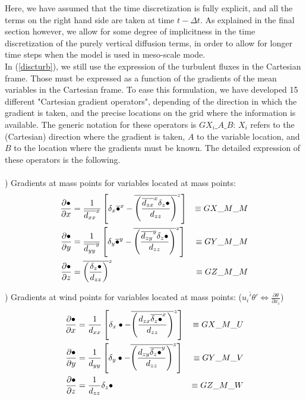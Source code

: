Here, we have assumed that the time discretization is fully explicit, and all
the terms on the right hand side are taken at time $t-\Delta t$. As
explained in the final section however, we allow for some degree of implicitness
in the time discretization of the purely vertical diffusion terms, in order
to allow for longer time steps when the model is used in meso-scale mode.
\\

In (\ref{discturb}), we still use the expression of the
turbulent fluxes in the Cartesian frame. Those must be expressed as a function
of the gradients of the mean variables in the Cartesian frame. To ease this
formulation, we have developed 15 different "Cartesian gradient operators",
depending of the direction in which the gradient is taken, and the precise
locations on the grid where the  information is available. The generic notation
for these operators is $GX_i\_A\_B$: $X_i$ refers to the (Cartesian) direction
where the gradient is taken, $A$ to the variable location, and $B$ to the
location where the gradients must be known. The detailed expression of these
operators is the following.
\\
\\
) Gradients at mass points for variables located at mass points:
\begin{eqnarray}
\frac{\partial \bullet}{\partial x}&=
\frac{1}{\overline{d_{xx}}^x}\left[ \delta_x \overline{\bullet}^x -
\overline{\left({\overline{d_{zx}}^x \delta_z \bullet \over d_{zz}}\right) }^z
\right]
&\equiv GX\_M\_M
\nonumber\\
\frac{\partial \bullet}{\partial y}&=
\frac{1}{\overline{d_{yy}}^y}\left[ \delta_y \overline{\bullet}^y -
\overline{\left({\overline{d_{zy}}^y \delta_z \bullet \over d_{zz}}\right) }^z
\right]
&\equiv GY\_M\_M
\nonumber\\
\frac{\partial \bullet}{\partial z}&=
\overline{\left( {\delta_z \bullet \over d_{zz} } \right) }^z
&\equiv GZ\_M\_M
\end{eqnarray}

) Gradients at wind points for variables located at mass points:
($\overline{u_i'\theta'}\Longleftrightarrow \frac{\partial \theta}{\partial x_i}$)
\begin{eqnarray}
\frac{\partial \bullet}{\partial x}&=
\frac{1}{d_{xx}}\left[ \delta_x \bullet -
\overline{\left({ d_{zx}\overline{\delta_z \bullet}^x \over d_{zz}}\right)}^z
\right]
&\equiv GX\_M\_U
\nonumber\\
\frac{\partial \bullet}{\partial y}&=
\frac{1}{d_{yy}}\left[ \delta_y \bullet -
\overline{\left({ d_{zy}\overline{\delta_z \bullet}^y \over d_{zz}}\right)}^z
\right]
&\equiv GY\_M\_V
\nonumber\\
\frac{\partial \bullet}{\partial z}&=
\frac{1}{d_{zz}} \delta_z \bullet
&\equiv GZ\_M\_W
\end{eqnarray}

